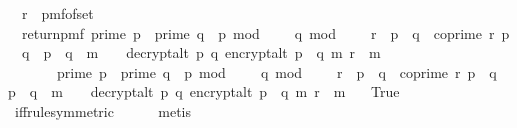 \begin{isabellebody}
\ \ r\ {\isasymleftarrow}\ pmf{\isacharunderscore}{\kern0pt}of{\isacharunderscore}{\kern0pt}set\ {\isasymZ}{\isacharsemicolon}{\kern0pt}\isanewline
\ \ return{\isacharunderscore}{\kern0pt}pmf\ {\isacharparenleft}{\kern0pt}{\isacharparenleft}{\kern0pt}{\isacharparenleft}{\kern0pt}{\isacharparenleft}{\kern0pt}prime\ p\ {\isasymand}\ prime\ q\ {\isasymand}\ p\ mod\ {}\ {\isacharequal}{\kern0pt}\ {}\ {\isasymand}\ q\ mod\ {}\ {\isacharequal}{\kern0pt}\ {}\ {\isasymand}\ r\ {\isacharless}{\kern0pt}\ p\ {\isacharasterisk}{\kern0pt}\ q\ {\isasymand}\ coprime\ r\ {\isacharparenleft}{\kern0pt}p\ {\isacharasterisk}{\kern0pt}\ q{\isacharparenright}{\kern0pt}\ {\isasymand}\ p\ {\isasymnoteq}\ q\ {\isasymand}\ m\ {\isasymnoteq}\ {\isacharbrackleft}{\kern0pt}{\isacharbrackright}{\kern0pt}{\isacharparenright}{\kern0pt}\ {\isasymlongrightarrow}\ decrypt{\isacharunderscore}{\kern0pt}alt\ p\ q\ {\isacharparenleft}{\kern0pt}encrypt{\isacharunderscore}{\kern0pt}alt\ {\isacharparenleft}{\kern0pt}p\ {\isacharasterisk}{\kern0pt}\ q{\isacharparenright}{\kern0pt}\ m\ r{\isacharparenright}{\kern0pt}\ {\isacharequal}{\kern0pt}\ m{\isacharparenright}{\kern0pt}\isanewline
\ \ \ \ \ \ {\isasymand}\ {\isacharparenleft}{\kern0pt}{\isasymnot}{\isacharparenleft}{\kern0pt}prime\ p\ {\isasymand}\ prime\ q\ {\isasymand}\ p\ mod\ {}\ {\isacharequal}{\kern0pt}\ {}\ {\isasymand}\ q\ mod\ {}\ {\isacharequal}{\kern0pt}\ {}\ {\isasymand}\ r\ {\isacharless}{\kern0pt}\ p\ {\isacharasterisk}{\kern0pt}\ q\ {\isasymand}\ coprime\ r\ {\isacharparenleft}{\kern0pt}p\ {\isacharasterisk}{\kern0pt}\ q{\isacharparenright}{\kern0pt}\ {\isasymand}\ p\ {\isasymnoteq}\ q\ {\isasymand}\ m\ {\isasymnoteq}\ {\isacharbrackleft}{\kern0pt}{\isacharbrackright}{\kern0pt}{\isacharparenright}{\kern0pt}\ {\isasymlongrightarrow}\ decrypt{\isacharunderscore}{\kern0pt}alt\ p\ q\ {\isacharparenleft}{\kern0pt}encrypt{\isacharunderscore}{\kern0pt}alt\ {\isacharparenleft}{\kern0pt}p\ {\isacharasterisk}{\kern0pt}\ q{\isacharparenright}{\kern0pt}\ m\ r{\isacharparenright}{\kern0pt}\ {\isacharequal}{\kern0pt}\ m{\isacharparenright}{\kern0pt}{\isacharparenright}{\kern0pt}{\isacharparenright}{\kern0pt}{\isacharbraceright}{\kern0pt}{\isacharparenright}{\kern0pt}\ \isanewline
\ \ True{\isachardoublequoteclose}\isanewline
\ \ \ \ \isamarkupfalse%
\ iff{\isacharunderscore}{\kern0pt}rule{\isacharbrackleft}{\kern0pt}symmetric{\isacharbrackright}{\kern0pt}\isanewline
\ \ \ \ \isamarkupfalse%
\ metis\isanewline
\ \ \isamarkupfalse%

\end{isabellebody}
